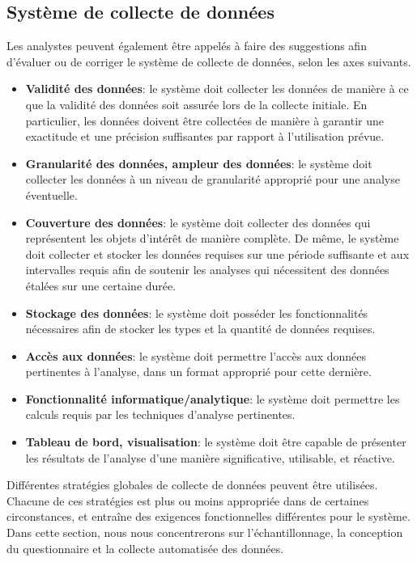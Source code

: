 \subsection{Système de collecte de données} Les analystes peuvent également être appelés à faire des suggestions afin d'évaluer ou de corriger le système de collecte de données, selon les axes suivants. 
\begin{itemize}[noitemsep]
\item \textbf{Validité des données}: le systè\-me doit collecter les données de manière à ce que la validité des données soit assurée lors de la collecte initiale. En particulier, les données doivent être collectées de manière à garantir une exactitude et une précision suffisantes par rapport à l'utilisation prévue.
\item \textbf{Granularité des données, ampleur des données}: le système doit collecter les données à un niveau de granularité approprié pour une analyse éventuelle.
\item \textbf{Couverture des données}: le système doit collecter des données qui représentent les objets d'intérêt de manière complète. De même, le système doit collecter et stocker les données requises sur une période suffisante et aux intervalles requis afin de soutenir les analyses qui nécessitent des données étalées sur une certaine durée.
\item \textbf{Stockage des données}: le système doit posséder les fonctionnalités nécessaires afin de stocker les types et la quantité de données requises.
\item \textbf{Accès aux données}: le système doit permettre l'accès aux données pertinentes à l'analyse, dans un format approprié pour cette dernière.
\item \textbf{Fonctionnalité informatique/analytique}: le systè\-me doit permettre les calculs requis par les techniques d'analyse pertinentes.
\item \textbf{Tableau de bord, visualisation}: le système doit être capable de présenter les résultats de l'analyse  d'une manière significative, utilisable, et réactive.
\end{itemize} 
Différentes stratégies globales de collecte de données peuvent être utilisées. Chacune de ces stratégies est plus ou moins appropriée dans de certaines circonstances, et entraîne des exigences fonctionnelles différentes pour le système. Dans cette section, nous nous concentrerons sur l'échantillonnage, la conception du questionnaire et la collecte automatisée des données. 
